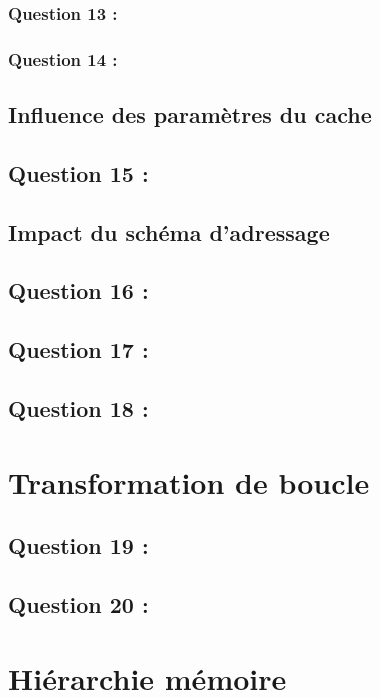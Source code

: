 \documentclass[11pt,a4paper]{article}
\begin{document}
	\subsubsection{Question 13 :}

	\subsubsection{Question 14 :}

	\subsection{Influence des paramètres du cache}
	\subsection{Question 15 :}

	\subsection{Impact du schéma d’adressage}
	\subsection{Question 16 :}

	\subsection{Question 17 :}

	\subsection{Question 18 :}

	\section{Transformation de boucle}
	\subsection{Question 19 :}

	\subsection{Question 20 :}

	\section{Hiérarchie mémoire}
\end{document}
